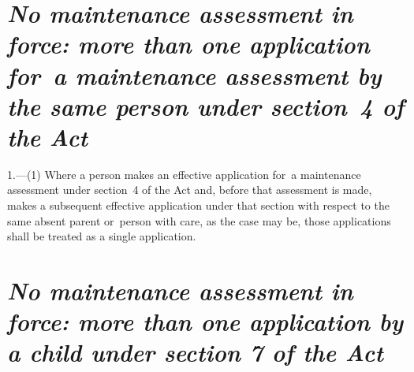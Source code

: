 \documentclass[a4paper,12pt]{article}
\begin{document}
\renewcommand\parthead{--- Schedule 2}

\section*{\itshape No maintenance assessment in force: more than one application for~a maintenance assessment by the same person under section~4 
of the Act}

1.—(1) Where a person makes an effective application for~a maintenance assessment under section~4 
of the Act and, before that assessment is made, makes a subsequent effective application under that section with respect to the same absent parent or~person with care, as the case may be, those applications shall be treated as a single application.

%
%


\section*{\itshape No maintenance assessment in force: more than one application by a child under section 7 of the Act}
\end{document}
